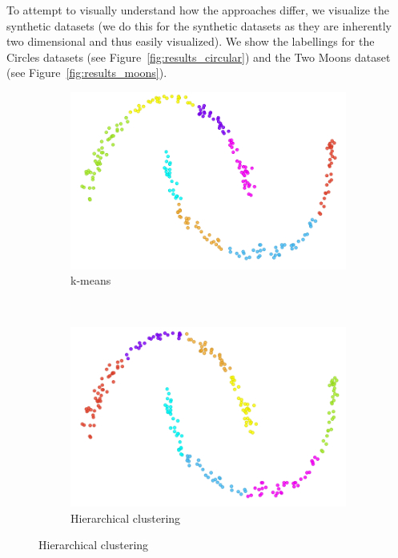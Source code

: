 \documentclass[conference]{IEEEtran}
\begin{document}
To attempt to visually understand how the approaches differ, we visualize the synthetic datasets (we do this for the synthetic datasets as they are inherently two dimensional and thus easily visualized). We show the labellings for the Circles datasets (see Figure~\ref{fig:results_circular}) and the Two Moons dataset (see Figure~\ref{fig:results_moons}).

\begin{figure}[h]
    \centering
    \begin{subfigure}[c]{0.48\columnwidth}
        \includegraphics[width=\columnwidth]{results/moons_hc.png}
        \caption{k-means}
        \label{fig:synthetic_two_moons}
    \end{subfigure}
    ~
    \begin{subfigure}[c]{0.48\columnwidth}
        \includegraphics[width=\columnwidth]{results/moons_kmeans.png}
        \caption{Hierarchical clustering}
        \label{fig:synthetic_circles}

\end{subfigure}
\end{figure}
\end{document}
